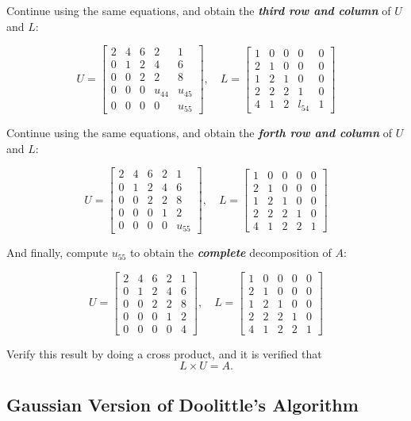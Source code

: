 \documentclass[a4paper,titlepage]{article}
\begin{document}
		Continue using the same equations, and obtain the \textbf{\textit{third row and column}} of $U$ and $L$:
		
		$$
			U = \begin{bmatrix}
				2 & 4 & 6 & 2 & 1\\
				0 & 1 & 2 & 4 & 6\\
				0 & 0 & 2 & 2 & 8\\
				0 & 0 & 0 & u_{44} & u_{45}\\
				0 & 0 & 0 & 0 & u_{55}
			\end{bmatrix}, \quad
			L = \begin{bmatrix}
				1 & 0 & 0 & 0 & 0\\
				2 & 1 & 0 & 0 & 0\\
				1 & 2 & 1 & 0 & 0\\
				2 & 2 & 2 & 1 & 0\\
				4 & 1 & 2 & l_{54} & 1
			\end{bmatrix}
		$$
		
		Continue using the same equations, and obtain the \textbf{\textit{forth row and column}} of $U$ and $L$:
		
		$$
		U = \begin{bmatrix}
		2 & 4 & 6 & 2 & 1\\
		0 & 1 & 2 & 4 & 6\\
		0 & 0 & 2 & 2 & 8\\
		0 & 0 & 0 & 1 & 2\\
		0 & 0 & 0 & 0 & u_{55}
		\end{bmatrix}, \quad
		L = \begin{bmatrix}
		1 & 0 & 0 & 0 & 0\\
		2 & 1 & 0 & 0 & 0\\
		1 & 2 & 1 & 0 & 0\\
		2 & 2 & 2 & 1 & 0\\
		4 & 1 & 2 & 2 & 1
		\end{bmatrix}
		$$
		
		And finally, compute $u_{55}$ to obtain the \textbf{\textit{complete}} decomposition of $A$:
		
		$$
		U = \begin{bmatrix}
		2 & 4 & 6 & 2 & 1\\
		0 & 1 & 2 & 4 & 6\\
		0 & 0 & 2 & 2 & 8\\
		0 & 0 & 0 & 1 & 2\\
		0 & 0 & 0 & 0 & 4
		\end{bmatrix}, \quad
		L = \begin{bmatrix}
		1 & 0 & 0 & 0 & 0\\
		2 & 1 & 0 & 0 & 0\\
		1 & 2 & 1 & 0 & 0\\
		2 & 2 & 2 & 1 & 0\\
		4 & 1 & 2 & 2 & 1
		\end{bmatrix}
		$$
		
		Verify this result by doing a cross product, and it is verified that 
		$$
			L \times U = A.
		$$
		
	\subsection{Gaussian Version of Doolittle's Algorithm}
\end{document}
